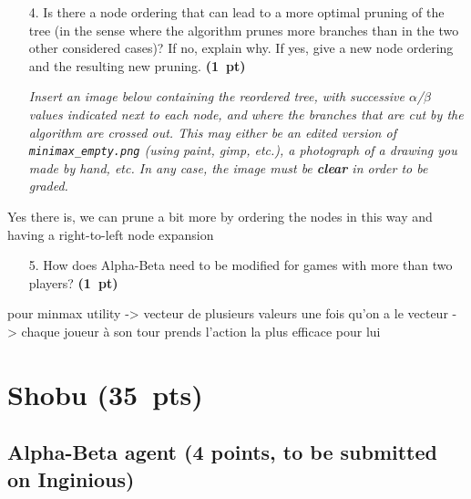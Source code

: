\documentclass[11pt,a4paper]{report}
\begin{document}
\clearpage
\begin{enumerate}
\item[4.] Is there a node ordering that can lead to a more optimal pruning of the tree
(in the sense where the algorithm prunes more branches than in the two other
considered cases)? If no, explain why. If yes, give a new node ordering and the
resulting new pruning.  \textbf{(1~pt)}
      
      \textit{Insert an image below containing the reordered tree, with successive $\alpha$/$\beta$ values indicated next to each node, and where the branches that are cut by the algorithm are crossed out. This may either be an edited version of \texttt{minimax\_empty.png} (using paint, gimp, etc.), a photograph of a drawing you made by hand, etc. In any case, the image must be \textbf{clear} in order to be graded.}
\end{enumerate}

\begin{answers}[8cm]
Yes there is, we can prune a bit more by ordering the nodes in this way and having a right-to-left node expansion
\end{answers}




\begin{enumerate}
\item[5.] How does Alpha-Beta need to be modified for games with more than two players? \textbf{(1~pt)}
\end{enumerate}

\begin{answers}[9cm]
pour minmax utility -> vecteur de plusieurs valeurs 
une fois qu'on a le vecteur -> chaque joueur à son tour prends l'action la plus efficace pour lui
\end{answers}





\clearpage
\section{Shobu (35~pts)}
\medskip

\subsection{Alpha-Beta agent (4 points, to be submitted on Inginious)}
\medskip
\end{document}
